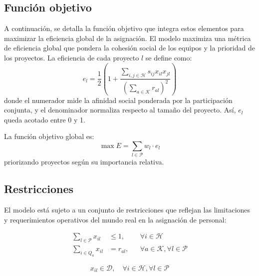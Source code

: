 \documentclass[conference]{IEEEtran}
\begin{document}
\subsection{Función objetivo}

A continuación, se detalla la función objetivo que integra estos elementos para maximizar la eficiencia global de la asignación.
El modelo maximiza una métrica de eficiencia global que pondera la cohesión social de los equipos y la prioridad de los proyectos. La eficiencia de cada proyecto \(l\) se define como:
\begin{equation}
    e_l = \frac{1}{2} \left( 1 + \frac{\sum_{i,j \in \mathcal{H}} s_{ij} x_{il} x_{jl}}{\left(\sum_{a \in \mathcal{K}} r_{al}\right)^2} \right)
    \label{eq:efficiency_project_updated}
\end{equation}
donde el numerador mide la afinidad social ponderada por la participación conjunta, y el denominador normaliza respecto al tamaño del proyecto. Así, \(e_l\) queda acotado entre 0 y 1.

La función objetivo global es:
\begin{equation}
    \max E = \sum_{l \in \mathcal{P}} w_l \cdot e_l
    \label{eq:objective_total_updated}
\end{equation}
priorizando proyectos según su importancia relativa.

\subsection{Restricciones}
El modelo está sujeto a un conjunto de restricciones que reflejan las limitaciones y requerimientos operativos del mundo real en la asignación de personal:

\begin{align}
    \sum_{l \in \mathcal{P}} x_{il}  &\leq 1, && \forall i \in \mathcal{H} \label{eq:constraint_capacity_updated} \\
    \sum_{i \in Q_a} x_{il}          &= r_{al}, && \forall a \in \mathcal{K}, \forall l \in \mathcal{P} \label{eq:constraint_skills_updated}
\end{align}

\begin{equation}
    x_{il} \in \mathcal{D}, \quad \forall i \in \mathcal{H}, \forall l \in \mathcal{P}
    \label{eq:constraint_discrete}
\end{equation}
\end{document}
